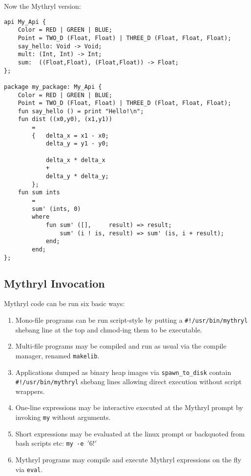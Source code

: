 Now the Mythryl version:

\begin{verbatim}
api My_Api {
    Color = RED | GREEN | BLUE;
    Point = TWO_D (Float, Float) | THREE_D (Float, Float, Float);
    say_hello: Void -> Void;
    mult: (Int, Int) -> Int;
    sum:  ((Float,Float), (Float,Float)) -> Float;
};

package my_package: My_Api {
    Color = RED | GREEN | BLUE;
    Point = TWO_D (Float, Float) | THREE_D (Float, Float, Float);
    fun say_hello () = print "Hello!\n";
    fun dist ((x0,y0), (x1,y1))
        =
        {   delta_x = x1 - x0;
            delta_y = y1 - y0;

            delta_x * delta_x
            +
            delta_y * delta_y;
        };
    fun sum ints
        =
        sum' (ints, 0)
        where
            fun sum' ([],     result) => result;
                sum' (i ! is, result) => sum' (is, i + result);
            end;
        end;
};

\end{verbatim}
\cutend*


\subsection{Mythryl Invocation}

Mythryl code can be run six basic ways:
\begin{enumerate}
\item Mono-file programs can be run script-style by putting a {\tt #!/usr/bin/mythryl} shebang line at the top and chmod-ing them to be executable.
\item Multi-file programs may be compiled and run as usual via the compile manager, renamed {\tt makelib}.
\item Applications dumped as binary heap images via {\tt spawn\_to\_disk} contain {\tt #!/usr/bin/mythryl} shebang lines allowing direct execution without script wrappers.
\item One-line expressions may be interactive executed at the Mythryl prompt by invoking {\tt my} without arguments.
\item Short expressions may be evaluated at the linux prompt or backquoted from bash scripts etc: {\tt my -e $'6!'$}
\item Mythryl programs may compile and execute Mythryl expressions on the fly via {\tt eval}.
\end{enumerate}

